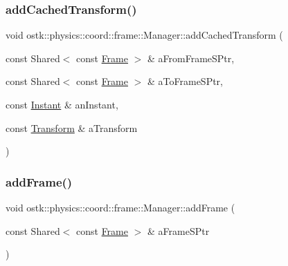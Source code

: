 \subsubsection{\texorpdfstring{add\+Cached\+Transform()}{addCachedTransform()}}
{\footnotesize\ttfamily void ostk\+::physics\+::coord\+::frame\+::\+Manager\+::add\+Cached\+Transform (\begin{DoxyParamCaption}\item[{const Shared$<$ const \hyperlink{classostk_1_1physics_1_1coord_1_1_frame}{Frame} $>$ \&}]{a\+From\+Frame\+S\+Ptr,  }\item[{const Shared$<$ const \hyperlink{classostk_1_1physics_1_1coord_1_1_frame}{Frame} $>$ \&}]{a\+To\+Frame\+S\+Ptr,  }\item[{const \hyperlink{classostk_1_1physics_1_1time_1_1_instant}{Instant} \&}]{an\+Instant,  }\item[{const \hyperlink{classostk_1_1physics_1_1coord_1_1_transform}{Transform} \&}]{a\+Transform }\end{DoxyParamCaption})}

\mbox{\label{classostk_1_1physics_1_1coord_1_1frame_1_1_manager_a75538bd860deefad7cce2347a6b96d97}} 
\subsubsection{\texorpdfstring{add\+Frame()}{addFrame()}}
{\footnotesize\ttfamily void ostk\+::physics\+::coord\+::frame\+::\+Manager\+::add\+Frame (\begin{DoxyParamCaption}\item[{const Shared$<$ const \hyperlink{classostk_1_1physics_1_1coord_1_1_frame}{Frame} $>$ \&}]{a\+Frame\+S\+Ptr }\end{DoxyParamCaption})}

\mbox{\label{classostk_1_1physics_1_1coord_1_1frame_1_1_manager_a58450dcde801cd274f45fd000e5e6bd7}} 
